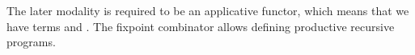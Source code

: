 \begin{AgdaAlign}
The later modality is required to be an applicative functor, which means that we have terms  and .
The fixpoint combinator  allows defining productive recursive programs. 
\begin{code}%
%
\>[4]\AgdaSpace{}%
\AgdaSymbol{:}\AgdaSpace{}%
\AgdaSymbol{\{}\AgdaSpace{}%
\AgdaSymbol{:}\AgdaSpace{}%
\AgdaSpace{}%
\AgdaSymbol{\}}\AgdaSpace{}%
\AgdaSymbol{\{}\AgdaSpace{}%
\AgdaSymbol{:}\AgdaSpace{}%
\AgdaSpace{}%
\AgdaSymbol{\}}\AgdaSpace{}%
\AgdaSpace{}%
\AgdaSpace{}%
\AgdaSpace{}%
\AgdaSpace{}%
\AgdaSpace{}%
\AgdaSpace{}%
\AgdaSpace{}%
\AgdaSymbol{(}\AgdaSpace{}%
\AgdaSymbol{)}\<%
\\
%
\>[4]\AgdaSpace{}%
\AgdaSymbol{:}\AgdaSpace{}%
\AgdaSymbol{\{}\AgdaSpace{}%
\AgdaSymbol{:}\AgdaSpace{}%
\AgdaSpace{}%
\AgdaSymbol{\}}\AgdaSpace{}%
\AgdaSymbol{\{}\AgdaSpace{}%
\AgdaSpace{}%
\AgdaSymbol{:}\AgdaSpace{}%
\AgdaSpace{}%
\AgdaSymbol{\}}\AgdaSpace{}%
\AgdaSpace{}%
\AgdaSpace{}%
\AgdaSpace{}%
\AgdaSymbol{(}\AgdaSpace{}%
\AgdaSymbol{(}\AgdaSpace{}%
\AgdaSpace{}%
\AgdaSymbol{))}\AgdaSpace{}%
\AgdaSpace{}%
\AgdaSpace{}%
\AgdaSpace{}%
\AgdaSymbol{(}\AgdaSpace{}%
\AgdaSymbol{)}\AgdaSpace{}%
\AgdaSpace{}%
\AgdaSpace{}%
\AgdaSpace{}%
\AgdaSymbol{(}\AgdaSpace{}%
\AgdaSymbol{)}\<%
\\
%
\>[4]\AgdaSpace{}%
\AgdaSymbol{:}\AgdaSpace{}%
\AgdaSymbol{\{}\AgdaSpace{}%
\AgdaSymbol{:}\AgdaSpace{}%
\AgdaSpace{}%
\AgdaSymbol{\}}\AgdaSpace{}%
\AgdaSymbol{\{}\AgdaSpace{}%
\AgdaSymbol{:}\AgdaSpace{}%
\AgdaSpace{}%
\AgdaSymbol{\}}\AgdaSpace{}%
\AgdaSpace{}%
\AgdaSpace{}%
\AgdaSpace{}%
\AgdaSymbol{(}\AgdaSpace{}%
\AgdaSpace{}%
\AgdaSpace{}%
\AgdaSymbol{)}\AgdaSpace{}%
\AgdaSpace{}%
\AgdaSpace{}%
\AgdaSpace{}%
\<%
\end{code}


\end{AgdaAlign}
